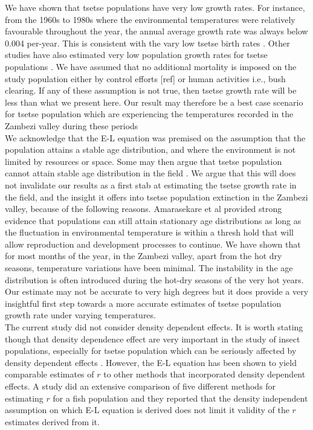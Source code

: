 \documentclass[10pt,a4paper]{article}
\begin{document}
We have shown that tsetse populations have very low growth rates. For instance, from the 1960s to 1980s where the environmental temperatures were relatively favourable throughout the year, the annual average growth rate was always below 0.004 per-year. This is consistent with the vary low tsetse birth rates \cite{Hargrove2004a,HARGROVE1988}. Other studies have also estimated very low population growth rates for tsetse populations \cite{VanSickle1988,Hargrove2004a}. We have assumed that no additional mortality is imposed on the study population either by control efforts [ref] or human activities i.e., bush clearing. If any of these assumption is not true, then tsetse growth rate will be less than what we present here. Our result may therefore be a best case scenario for tsetse population which are experiencing the temperatures recorded in the Zambezi valley during these periods \\


We acknowledge that the E-L equation was premised on the assumption that the population attains a stable age distribution, and where the environment is not limited by resources or space. Some may then argue that tsetse population cannot attain stable age distribution in the field \cite{VanSickle1988}. We argue that this will does not invalidate our results as a first stab at estimating the tsetse growth rate in the field, and the insight it offers into tsetse population extinction in the Zambezi valley,  because of the following reasons. Amarasekare et al \cite{Amarasekare2013} provided strong evidence that populations can still attain stationary age distributions as long as the fluctuation in environmental temperature is within a thresh hold that will allow reproduction and development processes to continue. We have shown that for most months of the year, in the Zambezi valley, apart from the hot dry seasons, temperature variations have been minimal. The instability in the age distribution is often introduced during the hot-dry seasons \cite{Hargrove2013b} of the very hot years. Our estimate may not be accurate to very high degrees but it does provide a very insightful first step towards a more accurate estimates of tsetse population growth rate under varying temperatures.  \\

The current study did not consider density dependent effects. It is worth stating though that density dependence effect are very important in the study of insect populations, especially for tsetse population which can be seriously affected by density dependent effects \cite{Rogers1975}. However, the E-L equation has been shown to yield  comparable estimates of $r$ to other methods that incorporated density dependent effects. A study \cite{Cortes2016} did an extensive comparison of five different methods for estimating $r$ for a fish population and they reported that the density independent assumption on which E-L equation is derived does not limit it validity of the $r$ estimates derived from it.    \\
\end{document}
